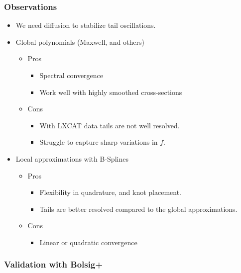 \documentclass[mathserif, aspectratio=169]{beamer}
\begin{document}
\begin{frame}
	\frametitle{Observations}
	\begin{itemize}
		\item We need diffusion to stabilize tail oscillations.
		\item Global polynomials (Maxwell, and others)
		\begin{itemize}
			\item Pros
			\begin{itemize}
				\item Spectral convergence
				\item Work well with highly smoothed cross-sections
			\end{itemize}
			\item Cons
			\begin{itemize}
				\item With LXCAT data tails are not well resolved. 
				\item Struggle to capture sharp variations in $f$.
			\end{itemize}
		\end{itemize}
		\item Local approximations with B-Splines
		\begin{itemize}
			\item Pros
			\begin{itemize}
				\item Flexibility in quadrature, and knot placement. 
				\item Tails are better resolved compared to the global approximations. 
			\end{itemize}
			\item Cons
			\begin{itemize}
				\item Linear or quadratic convergence
			\end{itemize}
		\end{itemize}
	\end{itemize}
\end{frame}

\begin{frame}
	\frametitle{Validation with Bolsig+}
	\begin{center}
	\end{center}
\end{frame}
\end{document}

